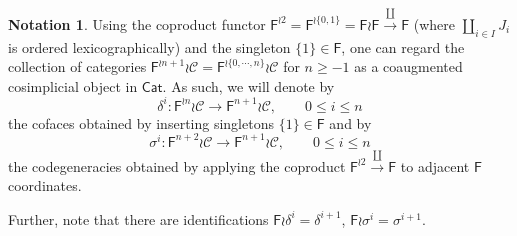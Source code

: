 \documentclass[a4paper,10pt
,draft
]{article}%
\numberwithin{equation}{section}
\numberwithin{figure}{section}
\theoremstyle{definition} %
\newtheorem{notation}[equation]{Notation}%
\newcommand{\Fin}{\mathsf{F}}%
\newcommand{\C}{\ensuremath{\mathcal C}}
\newcommand{\1}{\ensuremath{\mathbbm 1}}%
\begin{document}
\begin{notation}
      \label{FIN_COA_COS_NOT}
Using the coproduct functor $\Fin^{\wr 2} = \Fin^{\wr \{{0,1\}}} =\Fin \wr \Fin \xrightarrow{\amalg} \Fin$ (where $\coprod_{i\in I} J_i$ is ordered lexicographically) and the singleton $\{1\} \in \Fin$,
one can regard the collection of categories 
$\Fin^{\wr n+1 }\wr \C = \Fin^{\wr \{0,\cdots,n\}} \wr \C $ for $n \geq -1$
 as a coaugmented cosimplicial object in $\mathsf{Cat}$.
As such, we will denote by
\[
	\delta^i\colon \Fin^{\wr n } \wr \C \to \Fin^{n+1} \wr \C, \qquad 0 \leq i \leq n
\]
the cofaces obtained by inserting singletons $\{1\} \in \Fin$ and by 
\[
	\sigma^i \colon \Fin^{n+2} \wr \C \to \Fin^{n+1} \wr \C, \qquad 0 \leq i \leq n
\]
the codegeneracies obtained by applying the coproduct 
$\Fin^{\wr 2} \xrightarrow{\amalg} \Fin$ to adjacent 
$\Fin$ coordinates.

Further, note that there are identifications
$\Fin \wr \delta^{i} = \delta^{i+1}$, 
$\Fin \wr \sigma^{i} = \sigma^{i+1}$.
\end{notation}
 
\end{document}
